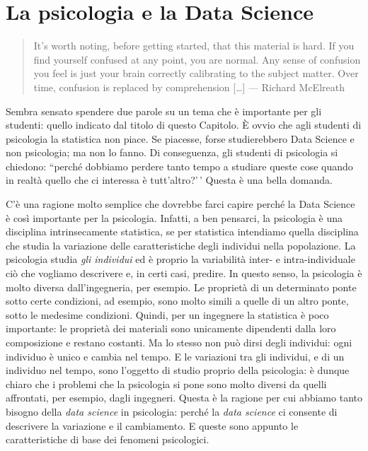 \documentclass[
  11pt,
  italian,
  a4paper,
  extrafontsizes,onecolumn,openright
  ]{memoir}
\theoremstyle{definition}
\theoremstyle{definition}
\theoremstyle{definition}
\theoremstyle{definition}
\theoremstyle{remark}
\begin{document}
\hypertarget{la-psicologia-e-la-data-science}{%
\section*{La psicologia e la Data Science}\label{la-psicologia-e-la-data-science}}

\begin{quote}
It's worth noting, before getting started, that this material is hard. If you find yourself confused at any point, you are normal. Any sense of confusion you feel is just your brain correctly calibrating to the subject matter. Over time, confusion is replaced by comprehension {[}\ldots{]} --- Richard McElreath
\end{quote}

Sembra sensato spendere due parole su un tema che è importante per gli studenti: quello indicato dal titolo di questo Capitolo. È ovvio che agli studenti di psicologia la statistica non piace. Se piacesse, forse studierebbero Data Science e non psicologia; ma non lo fanno. Di conseguenza, gli studenti di psicologia si chiedono: ``perché dobbiamo perdere tanto tempo a studiare queste cose quando in realtà quello che ci interessa è tutt'altro?'\,' Questa è una bella domanda.

C'è una ragione molto semplice che dovrebbe farci capire perché la Data Science è così importante per la psicologia. Infatti, a ben pensarci, la psicologia è una disciplina intrinsecamente statistica, se per statistica intendiamo quella disciplina che studia la variazione delle caratteristiche degli individui nella popolazione. La psicologia studia \emph{gli individui} ed è proprio la variabilità inter- e intra-individuale ciò che vogliamo descrivere e, in certi casi, predire. In questo senso, la psicologia è molto diversa dall'ingegneria, per esempio. Le proprietà di un determinato ponte sotto certe condizioni, ad esempio, sono molto simili a quelle di un altro ponte, sotto le medesime condizioni. Quindi, per un ingegnere la statistica è poco importante: le proprietà dei materiali sono unicamente dipendenti dalla loro composizione e restano costanti. Ma lo stesso non può dirsi degli individui: ogni individuo è unico e cambia nel tempo. E le variazioni tra gli individui, e di un individuo nel tempo, sono l'oggetto di studio proprio della psicologia: è dunque chiaro che i problemi che la psicologia si pone sono molto diversi da quelli affrontati, per esempio, dagli ingegneri. Questa è la ragione per cui abbiamo tanto bisogno della \emph{data science} in psicologia: perché la \emph{data science} ci consente di descrivere la variazione e il cambiamento. E queste sono appunto le caratteristiche di base dei fenomeni psicologici.
\end{document}
